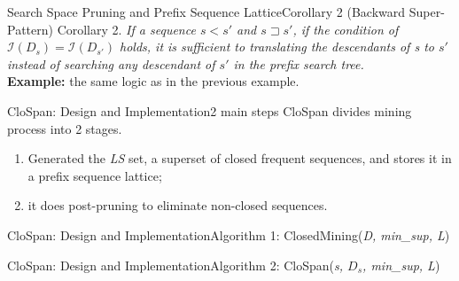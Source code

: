 \documentclass[12pt]{beamer}
\newcommand{\splitline}{\vspace{0.4cm}}
\begin{document}
\begin{frame}{Search Space Pruning and Prefix Sequence Lattice}{Corollary 2 (Backward Super-Pattern)}
Corollary 2. {\it If a sequence $s < s'$ and $s \sqsupset s'$, if the condition of $\mathcal{I}(D_s) = \mathcal{I}(D_{s'})$ holds, it is sufficient to translating the descendants of s to $s'$ instead of searching any descendant of $s'$ in the prefix search tree.}\\
\splitline
{\bf Example:} the same logic as in the previous example.
\end{frame}

\begin{frame}{CloSpan: Design and Implementation}{2 main steps}
CloSpan divides mining process into 2 stages.
\begin{enumerate}
\item Generated the {\it LS} set, a superset of closed frequent sequences, and stores it in a prefix sequence lattice;
\item it does post-pruning to eliminate non-closed sequences.
\end{enumerate}
\end{frame}

\begin{frame}{CloSpan: Design and Implementation}{Algorithm 1: ClosedMining({\it D, min\_sup, L})}
\begin{figure}
\end{figure}
\end{frame}

\begin{frame}{CloSpan: Design and Implementation}{Algorithm 2: CloSpan({\it s, $D_s$, min\_sup, L})}
\begin{figure}
\end{figure}
\end{frame}
\end{document}
